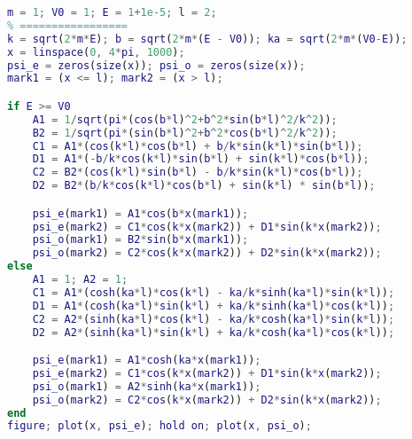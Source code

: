 
\begin{issues}
\issueDraft
\end{issues}


\begin{lstlisting}[language=matlab]
% === 设置参数 =====
m = 1; V0 = 1; E = 1+1e-5; l = 2;
% =================
k = sqrt(2*m*E); b = sqrt(2*m*(E - V0)); ka = sqrt(2*m*(V0-E));
x = linspace(0, 4*pi, 1000);
psi_e = zeros(size(x)); psi_o = zeros(size(x));
mark1 = (x <= l); mark2 = (x > l);

if E >= V0
    A1 = 1/sqrt(pi*(cos(b*l)^2+b^2*sin(b*l)^2/k^2));
    B2 = 1/sqrt(pi*(sin(b*l)^2+b^2*cos(b*l)^2/k^2));
    C1 = A1*(cos(k*l)*cos(b*l) + b/k*sin(k*l)*sin(b*l));
    D1 = A1*(-b/k*cos(k*l)*sin(b*l) + sin(k*l)*cos(b*l));
    C2 = B2*(cos(k*l)*sin(b*l) - b/k*sin(k*l)*cos(b*l));
    D2 = B2*(b/k*cos(k*l)*cos(b*l) + sin(k*l) * sin(b*l));

    psi_e(mark1) = A1*cos(b*x(mark1));
    psi_e(mark2) = C1*cos(k*x(mark2)) + D1*sin(k*x(mark2));
    psi_o(mark1) = B2*sin(b*x(mark1));
    psi_o(mark2) = C2*cos(k*x(mark2)) + D2*sin(k*x(mark2));
else
    A1 = 1; A2 = 1;
    C1 = A1*(cosh(ka*l)*cos(k*l) - ka/k*sinh(ka*l)*sin(k*l));
    D1 = A1*(cosh(ka*l)*sin(k*l) + ka/k*sinh(ka*l)*cos(k*l));
    C2 = A2*(sinh(ka*l)*cos(k*l) - ka/k*cosh(ka*l)*sin(k*l));
    D2 = A2*(sinh(ka*l)*sin(k*l) + ka/k*cosh(ka*l)*cos(k*l));

    psi_e(mark1) = A1*cosh(ka*x(mark1));
    psi_e(mark2) = C1*cos(k*x(mark2)) + D1*sin(k*x(mark2));
    psi_o(mark1) = A2*sinh(ka*x(mark1));
    psi_o(mark2) = C2*cos(k*x(mark2)) + D2*sin(k*x(mark2));
end
figure; plot(x, psi_e); hold on; plot(x, psi_o);
\end{lstlisting}
